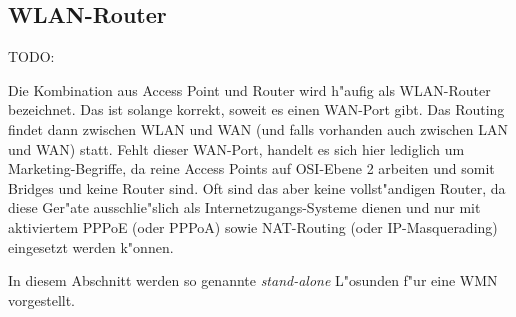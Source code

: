 \newpage

\subsection{WLAN-Router}

TODO: 

Die Kombination aus Access Point und Router wird h"aufig als WLAN-Router
bezeichnet. Das ist solange korrekt, soweit es einen WAN-Port gibt. Das
Routing findet dann zwischen WLAN und WAN (und falls vorhanden auch
zwischen LAN und WAN) statt. Fehlt dieser WAN-Port, handelt es sich hier
lediglich um Marketing-Begriffe, da reine Access Points auf OSI-Ebene 2
arbeiten und somit Bridges und keine Router sind. Oft sind das
aber keine vollst"andigen Router, da diese Ger"ate ausschlie"slich als
Internetzugangs-Systeme dienen und nur mit aktiviertem PPPoE (oder PPPoA)
sowie NAT-Routing (oder IP-Masquerading) eingesetzt werden k"onnen.

In diesem Abschnitt werden so genannte \emph{stand-alone} L"osunden f"ur
eine WMN vorgestellt.



